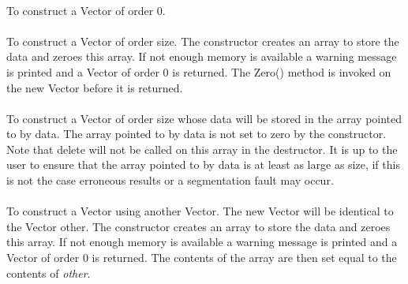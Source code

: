  \\
 \\
 \\
 \\
 \\
 \\
 \\
 \\ 
 \\ 


  \\
  \\
To construct a Vector of order $0$. \\

  \\
To construct a Vector of order \p size. The constructor creates an
array to store the data and zeroes this array. If not enough memory is
available a warning message is printed and a Vector of order $0$ is 
returned. The Zero()  method is invoked on the new Vector before
it is returned.\\ 

  \\
To construct a Vector of order \p size whose data will be stored in the
array pointed to by \p data. The array pointed to by data is not set to
zero by the constructor. Note that delete will not be called on this array
in the destructor. It is up to the user to ensure that the array pointed to
by \p data is at least as large as \p size, if this is not the case
erroneous results or a segmentation fault may occur.\\

  \\
To construct a Vector using another Vector. The new Vector will be
identical to the Vector \p other. The constructor creates an array
to store the data and zeroes this array. If not enough memory is available
a warning message is printed and a Vector of order $0$ is returned. The
contents of the array are then set equal to the contents of {\em
other}.\\ 

